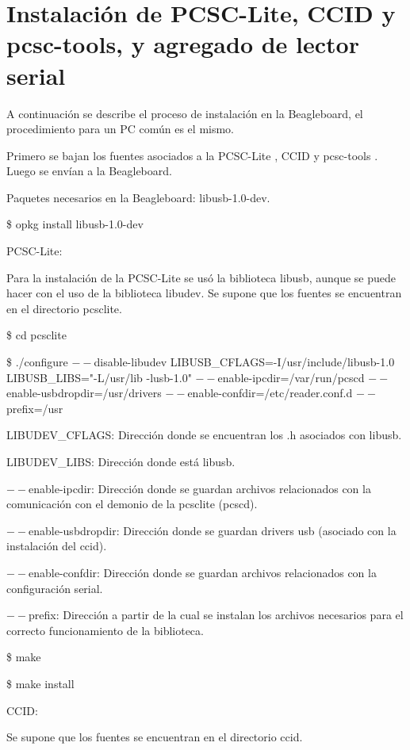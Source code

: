 \section{Instalación de PCSC-Lite, CCID y pcsc-tools, y agregado de lector serial}\label{anx_pcsc_inst}

A continuación se describe el proceso de instalación en la Beagleboard, el procedimiento para un PC común es el mismo.

\bigskip
Primero se bajan los fuentes asociados a la PCSC-Lite \cite{pcsc/ccid_down}, CCID \cite{pcsc/ccid_down} y pcsc-tools \cite{pcsctools_down}. Luego se envían a la Beagleboard.

\bigskip
Paquetes necesarios en la Beagleboard: libusb-1.0-dev.

\bigskip
\centerline{\$ opkg install libusb-1.0-dev}

\bigskip
PCSC-Lite:

\bigskip
Para la instalación de la PCSC-Lite se usó la biblioteca libusb, aunque se puede hacer con el uso de la biblioteca libudev.
Se supone que los fuentes se encuentran en el directorio pcsclite.

\centerline{\$ cd pcsclite}

\$ ./configure $--$disable-libudev LIBUSB\_CFLAGS=-I/usr/include/libusb-1.0 LIBUSB\_LIBS="-L/usr/lib -lusb-1.0" $--$enable-ipcdir=/var/run/pcscd $--$enable-usbdropdir=/usr/drivers $--$enable-confdir=/etc/reader.conf.d $--$prefix=/usr

\bigskip
LIBUDEV\_CFLAGS: Dirección donde se encuentran los .h asociados con libusb.

LIBUDEV\_LIBS: Dirección donde está libusb.

$--$enable-ipcdir: Dirección donde se guardan archivos relacionados con la comunicación con el demonio de la pcsclite (pcscd).

$--$enable-usbdropdir: Dirección donde se guardan drivers usb (asociado con la instalación del ccid).

$--$enable-confdir: Dirección donde se guardan archivos relacionados con la configuración serial.

$--$prefix:  Dirección a partir de la cual se instalan los archivos necesarios para el correcto funcionamiento de la biblioteca.

\bigskip
\centerline{\$ make}

\centerline{\$ make install}

\bigskip
CCID:

\bigskip
Se supone que los fuentes se encuentran en el directorio ccid.

